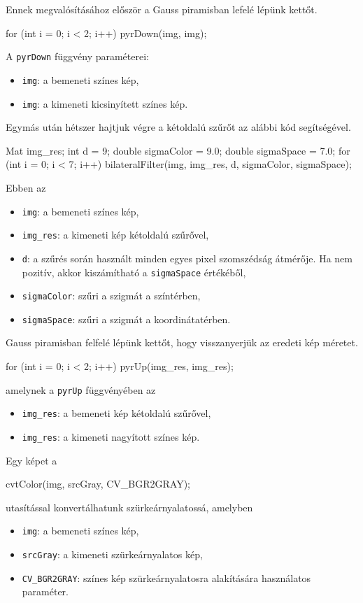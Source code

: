 Ennek megvalósításához először a Gauss piramisban lefelé lépünk kettőt.
\begin{cpp}
for (int i = 0; i < 2; i++) {
    pyrDown(img, img);
}
\end{cpp}
A \texttt{pyrDown} függvény paraméterei:
\begin{itemize}
    \item \texttt{img}: a bemeneti színes kép,
    \item \texttt{img}: a kimeneti kicsinyített színes kép.
\end{itemize}
Egymás után hétszer hajtjuk végre a kétoldalú szűrőt az alábbi kód segítségével.
\begin{cpp}
Mat img_res;
int d = 9;
double sigmaColor = 9.0;
double sigmaSpace = 7.0;
for (int i = 0; i < 7; i++) {
    bilateralFilter(img, img_res, d, sigmaColor, sigmaSpace);
}
\end{cpp}
Ebben az
\begin{itemize}
    \item \texttt{img}: a bemeneti színes kép,
    \item \texttt{img\_res}: a kimeneti kép kétoldalú szűrővel,
    \item \texttt{d}: a szűrés során használt minden egyes pixel szomszédság átmérője. Ha nem pozitív, akkor kiszámítható a \texttt{sigmaSpace} értékéből,
    \item \texttt{sigmaColor}: szűri a szigmát a színtérben,
    \item \texttt{sigmaSpace}: szűri a szigmát a koordinátatérben.
\end{itemize}
Gauss piramisban felfelé lépünk kettőt, hogy visszanyerjük az eredeti kép méretet.
\begin{cpp}
for (int i = 0; i < 2; i++) {
    pyrUp(img_res, img_res);
}
\end{cpp}
amelynek a \texttt{pyrUp} függvényében az
\begin{itemize}
    \item \texttt{img\_res}: a bemeneti kép kétoldalú szűrővel,
    \item \texttt{img\_res}: a kimeneti nagyított színes kép.
\end{itemize}
Egy képet a
\begin{cpp}
cvtColor(img, srcGray, CV_BGR2GRAY);
\end{cpp}
utasítással konvertálhatunk szürkeárnyalatossá, amelyben
\begin{itemize}
    \item \texttt{img}: a bemeneti színes kép,
    \item \texttt{srcGray}: a kimeneti szürkeárnyalatos kép,
    \item \texttt{CV\_BGR2GRAY}: színes kép szürkeárnyalatosra alakítására használatos paraméter.
\end{itemize}
